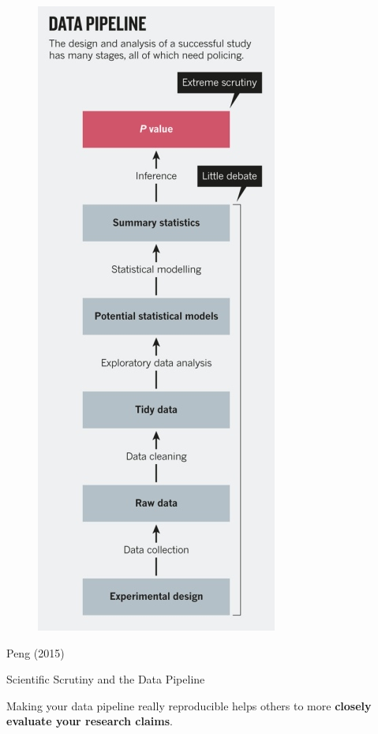 \documentclass[10pt]{beamer}
\begin{document}
\begin{frame}

    \begin{figure}
        \includegraphics[scale=0.3]{img/data_pipeline.jpg}
    \end{figure}

{\tiny{Peng (2015)}}

\end{frame}

\begin{frame}{Scientific Scrutiny and the Data Pipeline}

        Making your data pipeline really reproducible helps others to more \textbf{closely evaluate your research claims}.

\end{frame}
\end{document}
